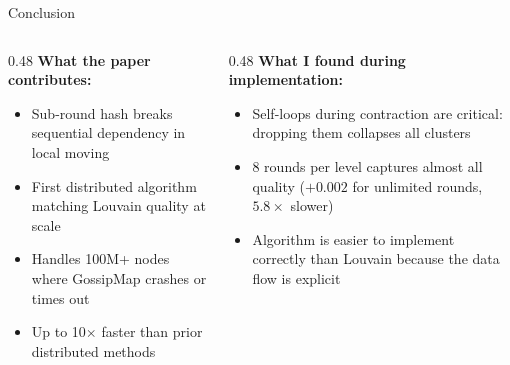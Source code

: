 \documentclass[aspectratio=169]{beamer}
\begin{document}
\begin{frame}{Conclusion}
  \begin{columns}[T]
    \begin{column}{0.48\textwidth}
      \textbf{What the paper contributes:}
      \begin{itemize}
        \item Sub-round hash breaks sequential dependency in local moving
        \item First distributed algorithm matching Louvain quality at scale
        \item Handles 100M+ nodes where GossipMap crashes or times out
        \item Up to 10$\times$ faster than prior distributed methods
      \end{itemize}
    \end{column}
    \begin{column}{0.48\textwidth}
      \textbf{What I found during implementation:}
      \begin{itemize}
        \item Self-loops during contraction are critical: dropping them collapses all clusters
        \item 8 rounds per level captures almost all quality ($+0.002$ for unlimited rounds, $5.8\times$ slower)
        \item Algorithm is easier to implement correctly than Louvain because the data flow is explicit
      \end{itemize}

      \bigskip
    \end{column}
  \end{columns}
\end{frame}
\end{document}
